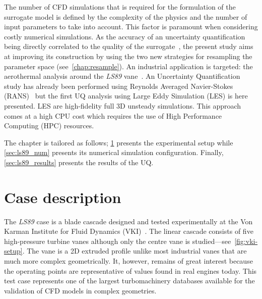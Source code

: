 The number of CFD simulations that is required for the formulation of the surrogate model is defined by the complexity of the physics and the number of input parameters to take into account. This factor is paramount when considering costly numerical simulations. As the accuracy of an uncertainty quantification being directly correlated to the quality of the surrogate~\cite{iooss2010}, the present study aims at improving its construction by using the two new strategies for resampling the parameter space (see~\cref{chap:resample}). An industrial application is targeted: the aerothermal analysis around the \textit{LS89} vane~\cite{arts1990}. An Uncertainty Quantification study has already been performed using Reynolds Averaged Navier-Stokes (RANS)~\cite{Gourdain2010,emory2016} but the first UQ analysis using Large Eddy Simulation (LES) is here presented. LES are high-fidelity full 3D unsteady simulations. This approach comes at a high CPU cost which requires the use of High Performance Computing (HPC) resources.

The chapter is tailored as follows; \cref{sec:ls89_case} presents the experimental setup while \cref{sec:ls89_num} presents its numerical simulation configuration. Finally, \cref{sec:ls89_results}  presents the results of the UQ.

\section{Case description}\label{sec:ls89_case}
The \textit{LS89} case is a blade cascade designed and tested experimentally at the Von Karman Institute for Fluid Dynamics (VKI)~\cite{arts1990}. The linear cascade consists of five high-pressure turbine vanes although only the centre vane is studied---see~\cref{fig:vki-setup}. The vane is a 2D extruded profile unlike most industrial vanes that are much more complex geometrically. It, however, remains of great interest because the operating points are representative of values found in real engines today. This test case represents one of the largest turbomachinery databases available for the validation of CFD models in complex geometries.


